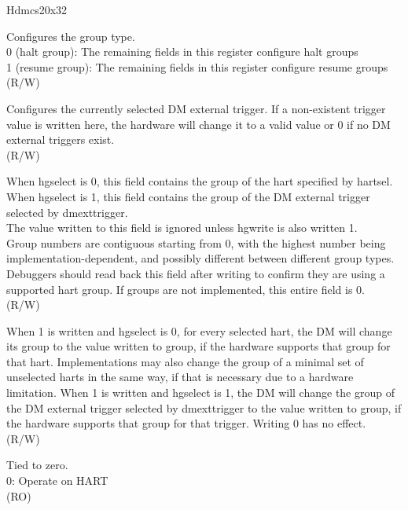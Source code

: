 
\begin{register}{H}{dmcs2}{0x32}\label{regdesc:dmcs2}
%
%
%
%
%
%
\regnewline%
\begin{regdesc}\begin{reglist}
\label{fielddesc:grouptype}\item [grouptype] Configures the group type.\\
0 (halt group): The remaining fields in this register configure halt groups \\
1 (resume group): The remaining fields in this register configure resume groups \\
(R/W)
\label{fielddesc:dmexttrigger}\item [dmexttrigger] Configures the currently selected DM external trigger. If a non-existent trigger value is written here, the hardware will change it to a valid value or 0 if no DM external triggers exist.\\
(R/W)
\label{fielddesc:group}\item [group] When hgselect is 0, this field contains the group of the hart specified by hartsel.\\
When hgselect is 1, this field contains the group of the DM external trigger selected by dmexttrigger.\\
The value written to this field is ignored unless hgwrite is also written 1.\\
Group numbers are contiguous starting from 0, with the highest number being implementation-dependent, and possibly different between different group types. Debuggers should read back this field after writing to confirm they are using a supported hart group.
If groups are not implemented, this entire field is 0.\\
(R/W)
\label{fielddesc:hgwrite}\item [hgwrite] When 1 is written and hgselect is 0, for every selected hart, the DM will change its group to the value written to group, if the hardware supports that group for that hart. Implementations may also change the group of a minimal set of unselected harts in the same way, if that is necessary due to a hardware limitation.
When 1 is written and hgselect is 1, the DM will change the group of the DM external trigger selected by dmexttrigger to the value written to group, if the hardware supports that group for that trigger. Writing 0 has no effect.\\
(R/W)
\label{fielddesc:hgselect}\item [hgselect] Tied to zero.\\
0: Operate on HART\\
(RO)
\end{reglist}\end{regdesc}
\end{register}
